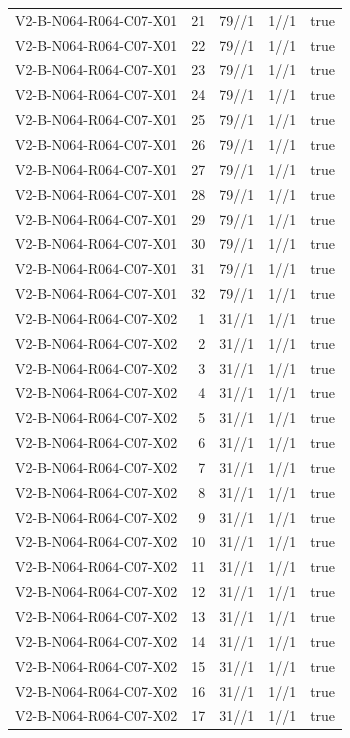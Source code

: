 {\begin{longtable}{lrrrr}
V2-B-N064-R064-C07-X01 & 21 & 79//1 & 1//1 & true \\
V2-B-N064-R064-C07-X01 & 22 & 79//1 & 1//1 & true \\
V2-B-N064-R064-C07-X01 & 23 & 79//1 & 1//1 & true \\
V2-B-N064-R064-C07-X01 & 24 & 79//1 & 1//1 & true \\
V2-B-N064-R064-C07-X01 & 25 & 79//1 & 1//1 & true \\
V2-B-N064-R064-C07-X01 & 26 & 79//1 & 1//1 & true \\
V2-B-N064-R064-C07-X01 & 27 & 79//1 & 1//1 & true \\
V2-B-N064-R064-C07-X01 & 28 & 79//1 & 1//1 & true \\
V2-B-N064-R064-C07-X01 & 29 & 79//1 & 1//1 & true \\
V2-B-N064-R064-C07-X01 & 30 & 79//1 & 1//1 & true \\
V2-B-N064-R064-C07-X01 & 31 & 79//1 & 1//1 & true \\
V2-B-N064-R064-C07-X01 & 32 & 79//1 & 1//1 & true \\
V2-B-N064-R064-C07-X02 & 1 & 31//1 & 1//1 & true \\
V2-B-N064-R064-C07-X02 & 2 & 31//1 & 1//1 & true \\
V2-B-N064-R064-C07-X02 & 3 & 31//1 & 1//1 & true \\
V2-B-N064-R064-C07-X02 & 4 & 31//1 & 1//1 & true \\
V2-B-N064-R064-C07-X02 & 5 & 31//1 & 1//1 & true \\
V2-B-N064-R064-C07-X02 & 6 & 31//1 & 1//1 & true \\
V2-B-N064-R064-C07-X02 & 7 & 31//1 & 1//1 & true \\
V2-B-N064-R064-C07-X02 & 8 & 31//1 & 1//1 & true \\
V2-B-N064-R064-C07-X02 & 9 & 31//1 & 1//1 & true \\
V2-B-N064-R064-C07-X02 & 10 & 31//1 & 1//1 & true \\
V2-B-N064-R064-C07-X02 & 11 & 31//1 & 1//1 & true \\
V2-B-N064-R064-C07-X02 & 12 & 31//1 & 1//1 & true \\
V2-B-N064-R064-C07-X02 & 13 & 31//1 & 1//1 & true \\
V2-B-N064-R064-C07-X02 & 14 & 31//1 & 1//1 & true \\
V2-B-N064-R064-C07-X02 & 15 & 31//1 & 1//1 & true \\
V2-B-N064-R064-C07-X02 & 16 & 31//1 & 1//1 & true \\
V2-B-N064-R064-C07-X02 & 17 & 31//1 & 1//1 & true \\

\end{longtable}}
